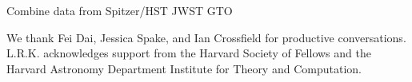 \documentclass[twocolumn]{aastex61}
\begin{document}
Combine data from Spitzer/HST
JWST GTO


\acknowledgments
We thank Fei Dai, Jessica Spake, and Ian Crossfield for productive conversations. L.R.K. acknowledges support from the Harvard Society of Fellows and the Harvard Astronomy Department Institute for Theory and Computation.

\vspace{5mm}







\end{document}
